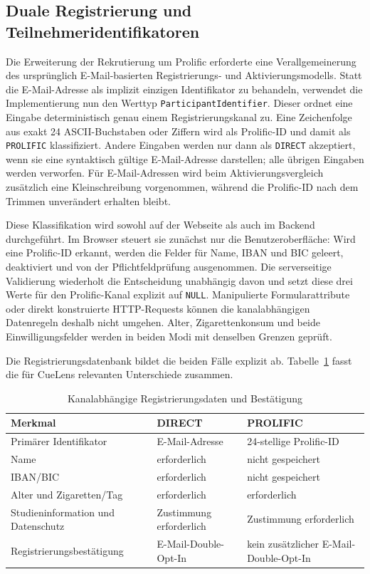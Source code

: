 
\begin{neu}
\section{Duale Registrierung und Teilnehmeridentifikatoren}

Die Erweiterung der Rekrutierung um Prolific erforderte eine Verallgemeinerung des ursprünglich E-Mail-basierten Registrierungs- und Aktivierungsmodells. Statt die E-Mail-Adresse als implizit einzigen Identifikator zu behandeln, verwendet die Implementierung nun den Werttyp \texttt{ParticipantIdentifier}. Dieser ordnet eine Eingabe deterministisch genau einem Registrierungskanal zu. Eine Zeichenfolge aus exakt 24 ASCII-Buchstaben oder Ziffern wird als Prolific-ID und damit als \texttt{PROLIFIC} klassifiziert. Andere Eingaben werden nur dann als \texttt{DIRECT} akzeptiert, wenn sie eine syntaktisch gültige E-Mail-Adresse darstellen; alle übrigen Eingaben werden verworfen. Für E-Mail-Adressen wird beim Aktivierungsvergleich zusätzlich eine Kleinschreibung vorgenommen, während die Prolific-ID nach dem Trimmen unverändert erhalten bleibt.

Diese Klassifikation wird sowohl auf der Webseite als auch im Backend durchgeführt. Im Browser steuert sie zunächst nur die Benutzeroberfläche: Wird eine Prolific-ID erkannt, werden die Felder für Name, IBAN und BIC geleert, deaktiviert und von der Pflichtfeldprüfung ausgenommen. Die serverseitige Validierung wiederholt die Entscheidung unabhängig davon und setzt diese drei Werte für den Prolific-Kanal explizit auf \texttt{NULL}. Manipulierte Formularattribute oder direkt konstruierte HTTP-Requests können die kanalabhängigen Datenregeln deshalb nicht umgehen. Alter, Zigarettenkonsum und beide Einwilligungsfelder werden in beiden Modi mit denselben Grenzen geprüft.

Die Registrierungsdatenbank bildet die beiden Fälle explizit ab. Tabelle~\ref{tab:dual-registration-fields} fasst die für CueLens relevanten Unterschiede zusammen.

\begin{table}[htbp]
\centering
\caption{Kanalabhängige Registrierungsdaten und Bestätigung}
\label{tab:dual-registration-fields}
\begin{tabular}{p{}p{}p{}}
\textbf{Merkmal} & \textbf{DIRECT} & \textbf{PROLIFIC} \\
\hline
Primärer Identifikator & E-Mail-Adresse & 24-stellige Prolific-ID \\
Name & erforderlich & nicht gespeichert \\
IBAN/BIC & erforderlich & nicht gespeichert \\
Alter und Zigaretten/Tag & erforderlich & erforderlich \\
Studieninformation und Datenschutz & Zustimmung erforderlich & Zustimmung erforderlich \\
Registrierungsbestätigung & E-Mail-Double-Opt-In & kein zusätzlicher E-Mail-Double-Opt-In \\
\end{tabular}
\end{table}


\end{neu}
